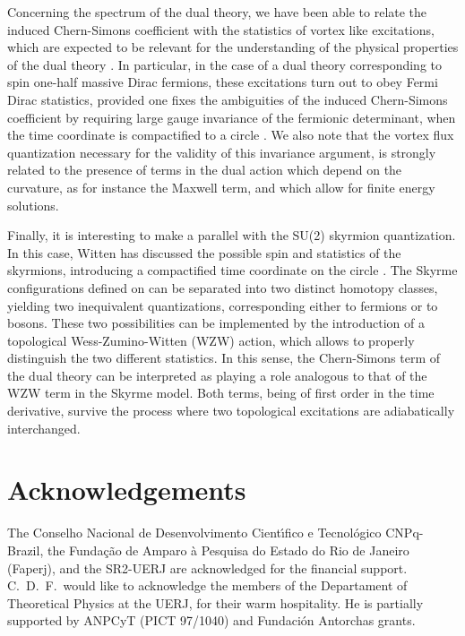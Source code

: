 \documentclass[a4paper,12pt]{article}
\begin{document}
Concerning the spectrum of the dual theory, we have been able to
relate the induced Chern-Simons coefficient with the statistics of
vortex like excitations, which are expected to be relevant for the
understanding of the physical properties of the dual theory {\cite{kov}}. In
particular, in the case of a dual theory corresponding to spin
one-half massive Dirac fermions, these excitations turn out to obey
Fermi Dirac statistics, provided one fixes the ambiguities of the
induced Chern-Simons coefficient by requiring large gauge invariance
of the fermionic determinant, when the time coordinate is compactified
to a circle \coordHE{}. We also note that the vortex flux quantization
necessary for the validity of this invariance argument, is strongly
related to the presence of terms in the dual action which depend on
the curvature, as for instance the Maxwell term, and which allow for
finite energy solutions.


Finally, it is interesting to make a parallel with the SU(2) skyrmion
quantization. In this case, Witten \cite{sky} has discussed the
possible spin and statistics of the skyrmions, introducing a
compactified time coordinate on the circle \coordHE{}. The \coordHE{} Skyrme
configurations defined on \coordHE{} can be separated into two
distinct homotopy classes, yielding two inequivalent quantizations,
corresponding either to fermions or to bosons. These two possibilities
can be implemented by the introduction of a topological
Wess-Zumino-Witten (WZW) action, which allows to properly distinguish
the two different statistics.  In this sense, the Chern-Simons term of
the dual theory can be interpreted as playing a role analogous to that
of the WZW term in the Skyrme model. Both terms, being of first order
in the time derivative, survive the process where two topological
excitations are adiabatically interchanged.



\section*{Acknowledgements}
The Conselho Nacional de Desenvolvimento Cient\'{\i}fico e
Tecnol\'{o}gico CNPq-Brazil, the Funda{\c {c}}{\~{a}}o de Amparo
{\`{a}} Pesquisa do Estado do Rio de Janeiro (Faperj), and the
SR2-UERJ are acknowledged for the financial support.  C.~D.~F.~would
like to acknowledge the members of the Departament of Theoretical
Physics at the UERJ, for their warm hospitality.  He is partially
supported by ANPCyT (PICT 97/1040) and Fundaci{\'o}n Antorchas grants.
\end{document}
